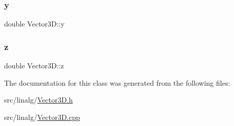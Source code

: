 \mbox{\label{classVector3D_adcec384756103d26d1181e45d5a0fd78}} 
\subsubsection{\texorpdfstring{y}{y}}
{\footnotesize\ttfamily double Vector3\+D\+::y\hspace{0.3cm}{\ttfamily [protected]}}

\mbox{\label{classVector3D_a7321f3ff785f275c4d83f7d1b951752a}} 
\subsubsection{\texorpdfstring{z}{z}}
{\footnotesize\ttfamily double Vector3\+D\+::z\hspace{0.3cm}{\ttfamily [protected]}}



The documentation for this class was generated from the following files\+:\begin{DoxyCompactItemize}
\item 
src/linalg/\mbox{\hyperlink{Vector3D_8h}{Vector3\+D.\+h}}\item 
src/linalg/\mbox{\hyperlink{Vector3D_8cpp}{Vector3\+D.\+cpp}}\end{DoxyCompactItemize}
